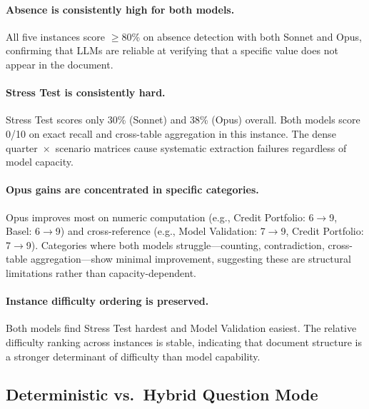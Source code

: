 \documentclass[11pt]{article}
\begin{document}
\paragraph{Absence is consistently high for both models.}
All five instances score $\geq$80\% on absence detection with both
Sonnet and Opus, confirming that LLMs are reliable at verifying that
a specific value does not appear in the document.

\paragraph{Stress Test is consistently hard.}
Stress Test scores only 30\% (Sonnet) and 38\% (Opus) overall.
Both models score 0/10 on exact recall and cross-table aggregation
in this instance.  The dense quarter~$\times$~scenario matrices
cause systematic extraction failures regardless of model capacity.

\paragraph{Opus gains are concentrated in specific categories.}
Opus improves most on numeric computation (e.g., Credit Portfolio:
6$\to$9, Basel: 6$\to$9) and cross-reference (e.g., Model Validation:
7$\to$9, Credit Portfolio: 7$\to$9).  Categories where both models
struggle---counting, contradiction, cross-table aggregation---show
minimal improvement, suggesting these are structural limitations
rather than capacity-dependent.

\paragraph{Instance difficulty ordering is preserved.}
Both models find Stress Test hardest and Model Validation easiest.
The relative difficulty ranking across instances is stable, indicating
that document structure is a stronger determinant of difficulty than
model capability.

\subsection{Deterministic vs.\ Hybrid Question Mode}
\label{sec:det_vs_hybrid}
\end{document}
